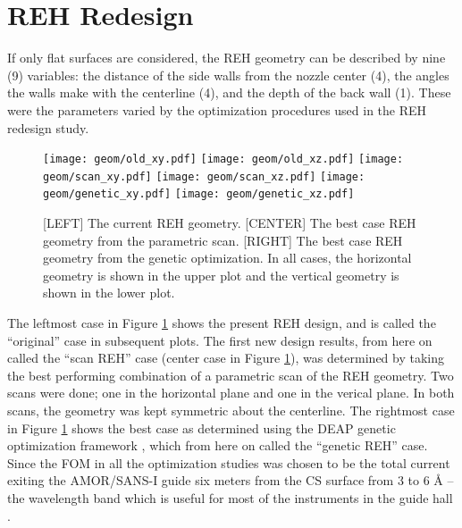 \documentclass[a4paper]{jpconf}
\begin{document}
\section{REH Redesign}

If only flat surfaces are considered, the REH geometry can be described by nine (9) variables:  the distance of the side walls from the nozzle center (4), the angles the walls make with the centerline (4), and the depth of the back wall (1).  These were the parameters varied by the optimization procedures used in the REH redesign study.

\begin{figure}[h!]
\begin{center}
\texttt{[image: geom/old\_xy.pdf]}    
\texttt{[image: geom/old\_xz.pdf]}
\quad
\texttt{[image: geom/scan\_xy.pdf]}     
\texttt{[image: geom/scan\_xz.pdf]}
\quad
\texttt{[image: geom/genetic\_xy.pdf]} 
\texttt{[image: geom/genetic\_xz.pdf]} 
\caption{\label{geom_cases} [LEFT] The current REH geometry. [CENTER] The best case REH geometry from the parametric scan. [RIGHT] The best case REH geometry from the genetic optimization.  In all cases, the horizontal geometry is shown in the upper plot and the vertical geometry is shown in the lower plot.}
\end{center}
\end{figure}

The leftmost case in Figure \ref{geom_cases} shows the present REH design, and is called the ``original'' case in subsequent plots.  The first new design results, from here on called the ``scan REH'' case (center case in Figure \ref{geom_cases}), was determined by taking the best performing combination of a parametric scan of the REH geometry. Two scans were done; one in the horizontal plane and one in the verical plane. In both scans, the geometry was kept symmetric about the centerline.  The rightmost case in Figure \ref{geom_cases} shows the best case as determined using the DEAP genetic optimization framework \cite{deap}, which from here on called the ``genetic REH'' case.  Since the FOM in all the optimization studies was chosen to be the total current exiting the AMOR/SANS-I guide six meters from the CS surface from 3 to 6 \AA{} -- the wavelength band which is useful for most of the instruments in the guide hall \cite{instruments_wavelength}. %
\end{document}
